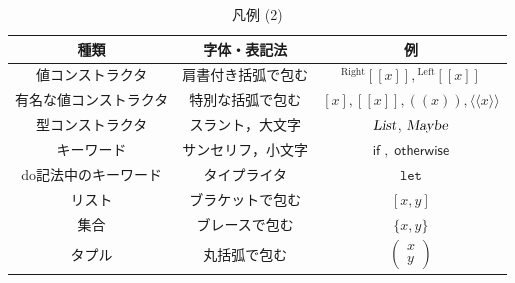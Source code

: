 \documentclass[a5paper,twoside,fleqn,draft]{jsbook}
\def\[{[\![}
\def\]{]\!]}
\newcommand{\Langle}{\langle\!\langle}
\newcommand{\Rangle}{\rangle\!\rangle}
\newcommand{\mKeyword}[1]{\mathsf{#1}}
\newcommand{\mVarKeyword}[1]{\texttt{#1}}
\newcommand{\mDoLetKeyword}{\mVarKeyword{let}}
\newcommand{\mIfKeyword}{\mKeyword{if}}
\newcommand{\mOtherwiseKeyword}{\mKeyword{otherwise}}
\DeclareMathOperator{\mIf}{\mIfKeyword}
\DeclareMathOperator{\mOtherwise}{\mOtherwiseKeyword}
\newcommand{\mTypeConstructor}[1]{\textsl{#1}}
\DeclareMathOperator{\mListTypeConstructor}{\mTypeConstructor{List}}
\DeclareMathOperator{\mMaybeTypeConstructor}{\mTypeConstructor{Maybe}}
\newcommand{\mValueConstructor}[1]{\mathrm{#1}}
\newcommand{\mValueWith}[2]{{}^\mValueConstructor{#1}\[#2\]}
\newcommand{\mLeftWith}[1]{\mValueWith{Left}{#1}}
\newcommand{\mRightWith}[1]{\mValueWith{Right}{#1}}
\newcommand{\mJustWith}[1]{\[#1\]}%
\newcommand{\mArrowWith}[1]{\Langle#1\Rangle}
\newcommand{\mFuncWith}[1]{((#1))}  %
\newcommand{\mPairWith}[2]{\begin{pmatrix}#1\\#2\end{pmatrix}}
\newcommand{\mTupleUnboxedWith}[1]{\texttt{(\#}#1\texttt{\#)}}
\begin{document}
\begin{table}[p]
\caption{凡例 (2)}
\begin{center}
\begin{tabular}{||c|c|c||}
\hline
種類&字体・表記法&例\\
\hline\hline
値コンストラクタ&肩書付き括弧で包む&$\mRightWith{x},\mLeftWith{x}$\\
有名な値コンストラクタ&特別な括弧で包む&$[x],\mJustWith{x},\mFuncWith{x},\mArrowWith{x}$\\
\hline
型コンストラクタ&スラント，大文字&$\mListTypeConstructor$, $\mMaybeTypeConstructor$\\
\hline
キーワード&サンセリフ，小文字&$\mIf,\mOtherwise$\\
do記法中のキーワード&タイプライタ&$\mDoLetKeyword$\\
\hline
リスト&ブラケットで包む&$[x,y]$\\
集合&ブレースで包む&$\{x,y\}$\\
タプル&丸括弧で包む&$\mPairWith{x}{y}$\\
\hline
\end{tabular}
\end{center}
\end{table}
\end{document}
